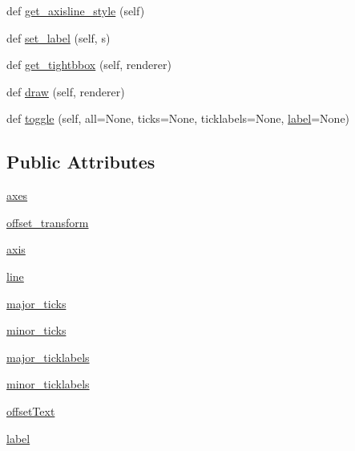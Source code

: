 \begin{DoxyCompactItemize}
\item 
def \hyperlink{classaxisartist_1_1axis__artist_1_1AxisArtist_ac8ad2ec38516ecbcbd4cc50dd111e700}{get\+\_\+axisline\+\_\+style} (self)
\item 
def \hyperlink{classaxisartist_1_1axis__artist_1_1AxisArtist_aafe2cbec638b167872ca487b6986c024}{set\+\_\+label} (self, s)
\item 
def \hyperlink{classaxisartist_1_1axis__artist_1_1AxisArtist_a146599e76572321f58defdc8365d4083}{get\+\_\+tightbbox} (self, renderer)
\item 
def \hyperlink{classaxisartist_1_1axis__artist_1_1AxisArtist_a7e180e241278fec77c060aec09482f83}{draw} (self, renderer)
\item 
def \hyperlink{classaxisartist_1_1axis__artist_1_1AxisArtist_a1554b34e483df14a55b0378ae0e4804d}{toggle} (self, all=None, ticks=None, ticklabels=None, \hyperlink{classaxisartist_1_1axis__artist_1_1AxisArtist_ac07cef8e6d22c587a1df5386d3cc6e40}{label}=None)
\end{DoxyCompactItemize}
\subsection*{Public Attributes}
\begin{DoxyCompactItemize}
\item 
\hyperlink{classaxisartist_1_1axis__artist_1_1AxisArtist_af4afb04cb8a9572ce7e06c56f01d5096}{axes}
\item 
\hyperlink{classaxisartist_1_1axis__artist_1_1AxisArtist_a42b2e84f8dbac0479fdc6f0464e3af0a}{offset\+\_\+transform}
\item 
\hyperlink{classaxisartist_1_1axis__artist_1_1AxisArtist_a67cb5dd5ed764c4bac765d0d3c9ae042}{axis}
\item 
\hyperlink{classaxisartist_1_1axis__artist_1_1AxisArtist_a990b36deb3b1349b2632674e45a7aabc}{line}
\item 
\hyperlink{classaxisartist_1_1axis__artist_1_1AxisArtist_a326ee61197218df266c710ce9d9070ae}{major\+\_\+ticks}
\item 
\hyperlink{classaxisartist_1_1axis__artist_1_1AxisArtist_aa3b273be74290cf8586a71f17da95384}{minor\+\_\+ticks}
\item 
\hyperlink{classaxisartist_1_1axis__artist_1_1AxisArtist_a5eb670449fd16345c3090952a9883b23}{major\+\_\+ticklabels}
\item 
\hyperlink{classaxisartist_1_1axis__artist_1_1AxisArtist_a8c902bb3ac4b211d89bc1c9ff6cca078}{minor\+\_\+ticklabels}
\item 
\hyperlink{classaxisartist_1_1axis__artist_1_1AxisArtist_aebf4a5244f5445431c2d7272c109f1f1}{offset\+Text}
\item 
\hyperlink{classaxisartist_1_1axis__artist_1_1AxisArtist_ac07cef8e6d22c587a1df5386d3cc6e40}{label}
\end{DoxyCompactItemize}
